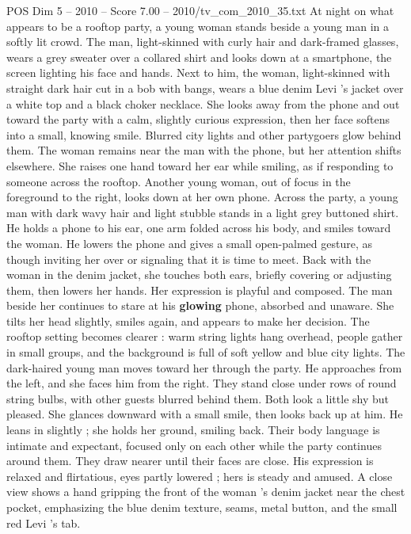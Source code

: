 \begin{textsample}{POS Dim 5 – 2010 – Score 7.00 – 2010/tv\_com\_2010\_35.txt}  \label{ex:f5_pos_050}
At night on what appears to be a rooftop party, a young woman stands beside a young man in a softly lit crowd.
The man, light-skinned with curly hair and dark-framed glasses, wears a grey sweater over a collared shirt and looks down at a smartphone, the screen lighting his face and hands.
Next to him, the woman, light-skinned with straight dark hair cut in a bob with bangs, wears a blue denim Levi ’s jacket over a white top and a black choker necklace.
She looks away from the phone and out toward the party with a calm, slightly curious expression, then her face softens into a small, knowing smile.
Blurred city lights and other partygoers glow behind them.
The woman remains near the man with the phone, but her attention shifts elsewhere.
She raises one hand toward her ear while smiling, as if responding to someone across the rooftop.
Another young woman, out of focus in the foreground to the right, looks down at her own phone.
Across the party, a young man with dark wavy hair and light stubble stands in a light grey buttoned shirt.
He holds a phone to his ear, one arm folded across his body, and smiles toward the woman.
He lowers the phone and gives a small open-palmed gesture, as though inviting her over or signaling that it is time to meet.
Back with the woman in the denim jacket, she touches both ears, briefly covering or adjusting them, then lowers her hands.
Her expression is playful and composed.
The man beside her continues to stare at his \textbf{glowing} phone, absorbed and unaware.
She tilts her head slightly, smiles again, and appears to make her decision.
The rooftop setting becomes clearer : warm string lights hang overhead, people gather in small groups, and the background is full of soft yellow and blue city lights.
The dark-haired young man moves toward her through the party.
He approaches from the left, and she faces him from the right.
They stand close under rows of round string bulbs, with other guests blurred behind them.
Both look a little shy but pleased.
She glances downward with a small smile, then looks back up at him.
He leans in slightly ; she holds her ground, smiling back.
Their body language is intimate and expectant, focused only on each other while the party continues around them.
They draw nearer until their faces are close.
His expression is relaxed and flirtatious, eyes partly lowered ; hers is steady and amused.
A close view shows a hand gripping the front of the woman ’s denim jacket near the chest pocket, emphasizing the blue denim texture, seams, metal button, and the small red Levi ’s tab.

\end{textsample}
